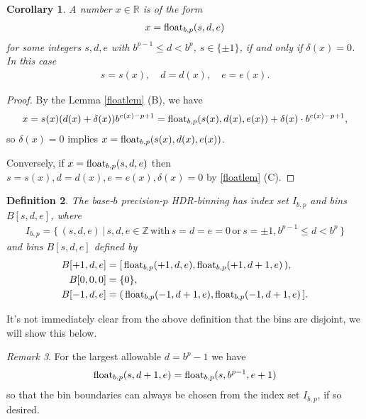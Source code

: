 \documentclass{article}
\theoremstyle{plain}
\newtheorem{definition}{Definition}[section]
\newtheorem{corollary}[definition]{Corollary}
\theoremstyle{remark}
\newtheorem{remark}[definition]{Remark}
\newcommand{\IR}{\mathbb{R}}
\newcommand{\IZ}{\mathbb{Z}}
\begin{document}
\begin{corollary}
  A number $x \in \IR$ is of the form
  \begin{align*}
    x = \mathrm{float}_{b,p}(s,d,e)
  \end{align*}
  for some integers $s,d,e$ with $b^{p-1} \leq d < b^p$, $s \in \{\pm 1\}$, if and only if $\delta(x) = 0$.
  In this case
  \begin{align*}
    s = s(x), \quad d = d(x), \quad e = e(x).
  \end{align*}
\end{corollary}
\begin{proof}
  By the Lemma \ref{floatlem} (B), we have
  \begin{align*}
    x = s(x) (d(x) + \delta(x)) b^{e(x)-p+1} = \mathrm{float}_{b,p}(s(x), d(x), e(x)) + \delta(x) \cdot b^{e(x) - p + 1},
  \end{align*}
  so $\delta(x) = 0$ implies $x = \mathrm{float}_{b,p}(s(x),d(x),e(x))$.

  Conversely, if $x = \mathrm{float}_{b,p}(s,d,e)$ then $s = s(x), d = d(x), e = e(x), \delta(x) = 0$ by \ref{floatlem} (C).
\end{proof}

\begin{definition} \label{hdrdef}
  The base-$b$ precision-$p$ HDR-binning has index set $I_{b,p}$ and bins $B[s,d,e]$, where
  \begin{align*}
    I_{b,p} = \{\, (s,d,e) \,|\, s,d,e \in \IZ \,\text{with}\, s=d=e=0 \,\text{or}\, s=\pm1, b^{p-1} \leq d < b^p \,\}
  \end{align*}
  and bins $B[s,d,e]$ defined by
  \begin{align}
    B[+1,d,e] &= \mathopen[\,\mathrm{float}_{b,p}(+1,d,e), \mathrm{float}_{b,p}(+1,d+1,e)\,\mathopen), \\
    B[0,0,0]  &= \{ 0 \}, \\
    B[-1,d,e] &= \mathopen(\,\mathrm{float}_{b,p}(-1,d+1,e), \mathrm{float}_{b,p}(-1,d+1,e)\,\mathopen].
  \end{align}
\end{definition}

It's not immediately clear from the above definition that the bins are disjoint, we will show this below.

\begin{remark} For the largest allowable $d=b^{p}-1$ we have
\begin{align*}
  \mathrm{float}_{b,p}(s,d + 1,e) = \mathrm{float}_{b,p}(s, b^{p-1}, e+1)
\end{align*}
so that the bin boundaries can always be chosen from the index set $I_{b,p}$, if so desired.
\end{remark}
\end{document}
